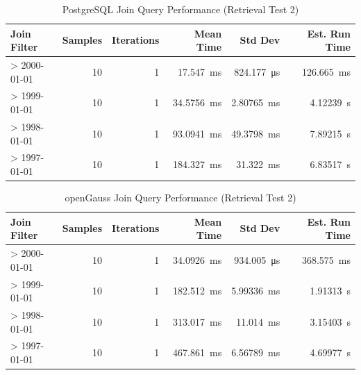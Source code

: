 \documentclass[14pt,a4paper]{article}
\begin{document}
    \begin{table}[H]
        \centering        
        \begin{tabular}{lrrrrr}
            \toprule
            \textbf{Join Filter} & \textbf{Samples} & \textbf{Iterations} & \textbf{Mean Time} & \textbf{Std Dev} & \textbf{Est. Run Time} \\
            \midrule
            > 2000-01-01 & 10 & 1 & \qty{17.547}{\milli\second} & \qty{824.177}{\micro\second} & \qty{126.665}{\milli\second} \\
            > 1999-01-01 & 10 & 1 & \qty{34.5756}{\milli\second} & \qty{2.80765}{\milli\second} & \qty{4.12239}{\second} \\
            > 1998-01-01 & 10 & 1 & \qty{93.0941}{\milli\second} & \qty{49.3798}{\milli\second} & \qty{7.89215}{\second} \\
            > 1997-01-01 & 10 & 1 & \qty{184.327}{\milli\second} & \qty{31.322}{\milli\second} & \qty{6.83517}{\second} \\
            \bottomrule
        \end{tabular}
        \caption{PostgreSQL Join Query Performance (Retrieval Test 2)}
    \end{table}
    
    \begin{table}[H]
        \centering        
        \begin{tabular}{lrrrrr}
            \toprule
            \textbf{Join Filter} & \textbf{Samples} & \textbf{Iterations} & \textbf{Mean Time} & \textbf{Std Dev} & \textbf{Est. Run Time} \\
            \midrule
            > 2000-01-01 & 10 & 1 & \qty{34.0926}{\milli\second} & \qty{934.005}{\micro\second} & \qty{368.575}{\milli\second} \\
            > 1999-01-01 & 10 & 1 & \qty{182.512}{\milli\second} & \qty{5.99336}{\milli\second} & \qty{1.91313}{\second} \\
            > 1998-01-01 & 10 & 1 & \qty{313.017}{\milli\second} & \qty{11.014}{\milli\second} & \qty{3.15403}{\second} \\
            > 1997-01-01 & 10 & 1 & \qty{467.861}{\milli\second} & \qty{6.56789}{\milli\second} & \qty{4.69977}{\second} \\
            \bottomrule
        \end{tabular}
        \caption{openGauss Join Query Performance (Retrieval Test 2)}
    \end{table}
    
\end{document}

